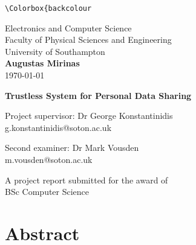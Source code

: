 \documentclass[12pt]{article}
\begin{document}
    \makeatletter
    \xpretocmd\lstinline{\Colorbox{backcolour}\bgroup\appto\lst@DeInit{\egroup}}{}{}
    \makeatother

    \begin{titlepage}
        \begin{center}
            \vspace{1cm}

            \LARGE
            Electronics and Computer Science\\
            Faculty of Physical Sciences and Engineering\\
            University of Southampton\\

            \Large
            \vspace{1.5cm}
            \textbf{Augustas Mirinas}\\
            \today

            \LARGE
            \vspace{1.5cm}
            \textbf{Trustless System for Personal Data Sharing}
            
            \vspace{1.5cm}
            \Large
            Project supervisor: Dr George Konstantinidis\\
            g.konstantinidis@soton.ac.uk
            
            \Large
            Second examiner: Dr Mark Vousden\\
            m.vousden@soton.ac.uk
            
            \vfill
            A project report submitted for the award of\\
            BSc Computer Science
            
        \end{center}
    \end{titlepage}

    \section*{Abstract}
    

    \newpage
    \tableofcontents

    
    \newpage
\end{document}
